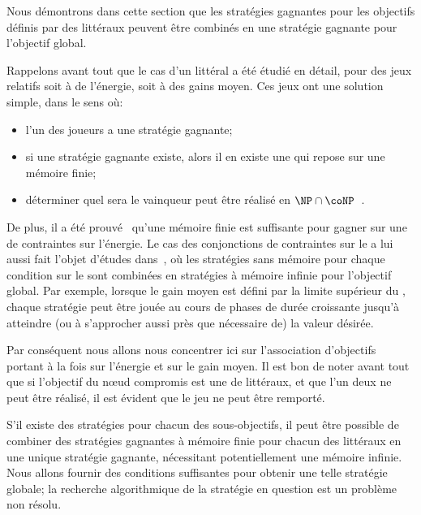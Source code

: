 \bigskip

Nous démontrons dans cette section que les stratégies gagnantes pour les objectifs définis par des littéraux peuvent être combinés en une stratégie gagnante pour l'objectif global.

Rappelons avant tout que le cas d'un littéral a été étudié en détail, pour des jeux relatifs soit à de l'énergie, soit à des gains moyen.
Ces jeux ont une solution simple, dans le sens où:
\begin{itemize}
    \item l'un des joueurs a une stratégie gagnante;
    \item si une stratégie gagnante existe, alors il en existe une qui repose sur une mémoire finie;
    \item déterminer quel sera le  vainqueur peut être réalisé en $\NP\cap \coNP$~\cite{zwick96}.
\end{itemize}
De plus, il a été prouvé~\cite{velner12a} qu'une mémoire finie est suffisante pour gagner sur une  de contraintes sur l'énergie.
Le cas des conjonctions de contraintes sur le  a lui aussi fait l'objet d'études dans~\cite{velner12a}, où les stratégies sans mémoire pour chaque condition sur le  sont combinées en stratégies à mémoire infinie pour l'objectif global.
Par exemple, lorsque le gain moyen est défini par la limite supérieur du , chaque stratégie peut être jouée au cours de phases de durée croissante jusqu'à atteindre (ou à s'approcher aussi près que nécessaire de) la valeur désirée.

Par conséquent nous allons nous concentrer ici sur l'association d'objectifs portant à la fois sur l'énergie et sur le gain moyen.
Il est bon de noter avant tout que si l'objectif du nœud compromis est une  de littéraux, et que l'un deux ne peut être réalisé, il est évident que le jeu ne peut être remporté.

S'il existe des stratégies pour chacun des sous-objectifs, il peut être possible de combiner des stratégies gagnantes à mémoire finie pour chacun des littéraux en une unique stratégie gagnante, nécessitant potentiellement une mémoire infinie.
Nous allons fournir des conditions suffisantes pour obtenir une telle stratégie globale; la recherche algorithmique de la stratégie en question est un problème non résolu.

